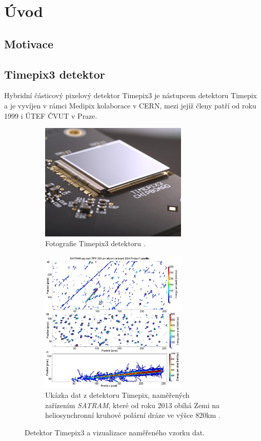 

\chapter{Úvod}\label{chap01} 
\todo

\section{Motivace}
\todo

\section{Timepix3 detektor}
Hybridní částicový pixelový detektor Timepix3\cite{timepix3} je nástupcem detektoru Timepix\cite{timepix} a je vyvíjen v rámci Medipix kolaborace v CERN, mezi jejíž členy patří od roku 1999 i ÚTEF ČVUT v Praze.

\begin{figure}[h]
    \begin{center}
        \begin{subfigure}{7.0cm}
            \includegraphics[width=7cm]{figures/timepix3.jpg}    
            \caption{Fotografie Timepix3 detektoru \cite{medipix_from_medical_img_to_space}.}
        \end{subfigure}
        \hspace{0.1cm}
        \begin{subfigure}{7.0cm}
            \includegraphics[width=7cm]{figures/timepix_data_satram.png}    
            \caption{Ukázka dat z detektoru Timepix, naměřených zařízením \textit{SATRAM}, které od roku 2013 obíhá Zemi na heliosynchronní kruhové polární dráze ve výšce \unit{820}{km} \cite{PlatkevicDisertace}.}
        \end{subfigure}
	\end{center}
    \caption{Detektor Timepix3 a vizualizace naměřeného vzorku dat.}
	\label{fig:master:frontend:detector_detail}
\end{figure}

